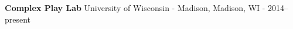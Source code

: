 \documentclass[../main.tex]{subfiles}
\begin{document}
\textbf{Complex Play Lab}
	University of Wisconsin - Madison, Madison, WI - 2014--present
\end{document}
